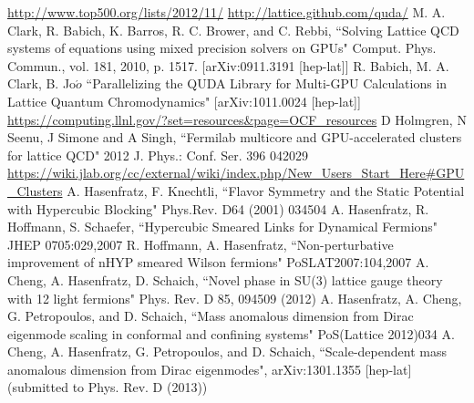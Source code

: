 \documentclass[11pt]{article}
\begin{document}
%
\begin{thebibliography}{99}
\url{http://www.top500.org/lists/2012/11/}
\url{http://lattice.github.com/quda/}
M. A. Clark, R. Babich, K. Barros, R. C. Brower, and C. Rebbi,
``Solving Lattice QCD systems of equations using mixed precision solvers on GPUs" Comput. Phys. Commun., vol. 181, 2010, p. 1517. [arXiv:0911.3191 
[hep-lat]]
R. Babich, M. A. Clark, B. Jo$\acute{o}$ ``Parallelizing the QUDA Library for Multi-GPU Calculations in Lattice Quantum Chromodynamics" [arXiv:1011.0024 
[hep-lat]]
\url{https://computing.llnl.gov/?set=resources&page=OCF_resources}
D Holmgren, N Seenu, J Simone and A Singh, ``Fermilab multicore and GPU-accelerated clusters for lattice QCD" 2012 J. Phys.: Conf. Ser. 396 042029
\url{https://wiki.jlab.org/cc/external/wiki/index.php/New_Users_Start_Here#GPU_Clusters}
A. Hasenfratz, F. Knechtli, ``Flavor Symmetry and the Static Potential with Hypercubic Blocking" Phys.Rev. D64 (2001) 034504
A. Hasenfratz, R. Hoffmann, S. Schaefer, ``Hypercubic Smeared Links for Dynamical Fermions" JHEP 0705:029,2007
R. Hoffmann, A. Hasenfratz, ``Non-perturbative improvement of nHYP smeared Wilson fermions" PoSLAT2007:104,2007
A. Cheng, A. Hasenfratz, D. Schaich, ``Novel phase in SU(3) lattice gauge theory with 12 light fermions" Phys. Rev. D 85, 094509 (2012) 
A. Hasenfratz, A. Cheng, G. Petropoulos, and D. Schaich, ``Mass anomalous dimension from Dirac eigenmode scaling in conformal and confining systems" PoS(Lattice 2012)034
A. Cheng, A. Hasenfratz, G. Petropoulos, and D. Schaich, ``Scale-dependent mass anomalous dimension from Dirac eigenmodes",  arXiv:1301.1355 [hep-lat] (submitted to Phys. Rev. D (2013))

\end{thebibliography}
\end{document}
